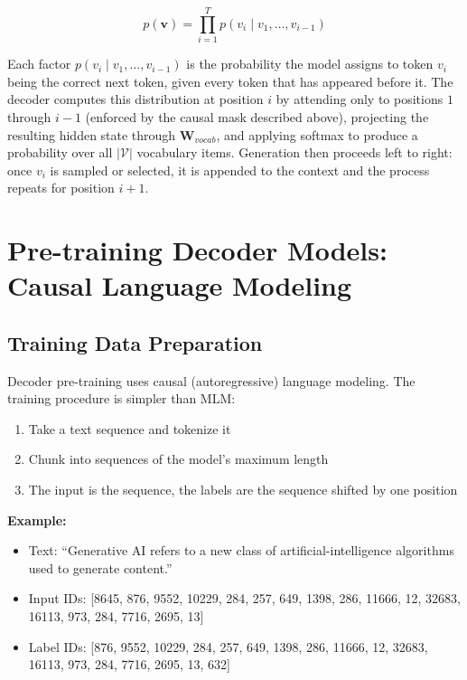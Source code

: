 \documentclass{book}
\begin{document}
\begin{equation}
p(\mathbf{v}) = \prod_{i=1}^{T} p(v_i \mid v_1, \ldots, v_{i-1})
\end{equation}

Each factor $p(v_i \mid v_1, \ldots, v_{i-1})$ is the probability the model
assigns to token $v_i$ being the correct next token, given every token that
has appeared before it. The decoder computes this distribution at position $i$
by attending only to positions $1$ through $i-1$ (enforced by the causal mask
described above), projecting the resulting hidden state through $\mathbf{W}_{vocab}$,
and applying softmax to produce a probability over all $|\mathcal{V}|$ vocabulary
items. Generation then proceeds left to right: once $v_i$ is sampled or
selected, it is appended to the context and the process repeats for position
$i+1$.


\section{Pre-training Decoder Models: Causal Language Modeling}

\subsection{Training Data Preparation}

Decoder pre-training uses causal (autoregressive) language modeling. The training procedure is simpler than MLM:

\begin{enumerate}
\item Take a text sequence and tokenize it
\item Chunk into sequences of the model's maximum length
\item The input is the sequence, the labels are the sequence shifted by one position
\end{enumerate}

\textbf{Example:}
\begin{itemize}
\item Text: ``Generative AI refers to a new class of artificial-intelligence algorithms used to generate content.''
\item Input IDs: [8645, 876, 9552, 10229, 284, 257, 649, 1398, 286, 11666, 12, 32683, 16113, 973, 284, 7716, 2695, 13]
\item Label IDs: [876, 9552, 10229, 284, 257, 649, 1398, 286, 11666, 12, 32683, 16113, 973, 284, 7716, 2695, 13, 632]
\end{itemize}
\end{document}
